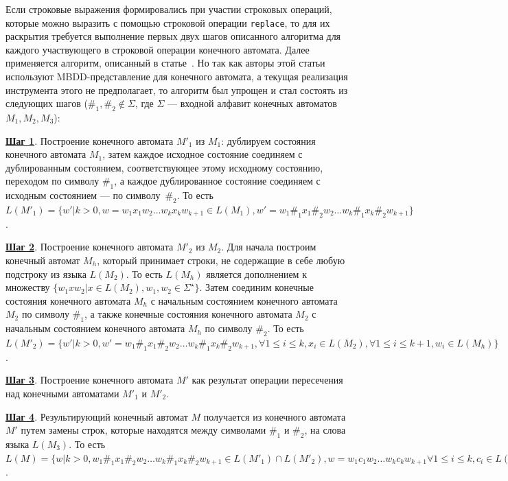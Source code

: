 \documentclass{matmex-diploma}
\begin{document}
Если строковые выражения формировались при участии строковых операций, которые можно выразить с помощью строковой операции \verb|replace|, то для их раскрытия требуется выполнение первых двух шагов описанного алгоритма для каждого участвующего в строковой операции конечного автомата. Далее применяется алгоритм, описанный в статье~\cite{ReplaceFangYu}. Но так как авторы этой статьи используют MBDD-представление для конечного автомата, а текущая реализация инструмента этого не предполагает, то алгоритм был упрощен и стал состоять из следующих шагов ($\#_1, \#_2 \notin \Sigma$, где $\Sigma$ --- входной алфавит конечных автоматов $M_1, M_2, M_3$): 

\textbf{\underline{Шаг 1}}. Построение конечного автомата $M'_1$ из $M_1$: дублируем состояния конечного автомата $M_1$, затем каждое исходное состояние соединяем с дублированным состоянием, соответствующее этому исходному состоянию, переходом по символу $\#_1$, а каждое дублированное состояние соединяем с исходным состоянием --- по символу~$\#_2$. То есть $L(M'_1) = \{ w' | k > 0, w =  w_{1}x_{1}w_{2}\ldots w_{k}x_{k}w_{k+1} \in L(M_1), w' = w_{1}\#_{1}x_{1}\#_{2}w_{2}\ldots w_{k}\#_{1}x_{k}\#_{2}w_{k+1}\}$.

\textbf{\underline{Шаг 2}}. Построение конечного автомата $M'_2$ из $M_2$. Для начала построим конечный автомат $M_h$, который принимает строки, не содержащие в себе любую подстроку из языка $L(M_2)$.  То есть $L(M_h)$ является дополнением к множеству $\{w_{1}xw_{2} | x \in L(M_2), w_1, w_2 \in \Sigma^{\star}\}$. Затем соединим конечные состояния конечного автомата $M_h$ с начальным состоянием конечного автомата $M_2$ по символу $\#_1$, а также конечные состояния конечного автомата $M_2$ с начальным состоянием конечного автомата $M_h$ по символу $\#_2$. То есть $L(M'_2) = \{ w' | k > 0, w' = w_{1}\#_{1}x_{1}\#_{2}w_{2} \ldots w_{k}\#_{1}x_{k}\#_{2}w_{k+1}, \forall 1 \le i \le k, x_i \in L(M_2), \forall 1 \le i \le k+1, w_i \in L(M_h)\}$.

\textbf{\underline{Шаг 3}}. Построение конечного автомата $M'$ как результат операции пересечения над конечными автоматами $M'_1$ и $M'_2$.

\textbf{\underline{Шаг 4}}. Результирующий конечный автомат $M$ получается из конечного автомата $M'$ путем замены строк, которые находятся между символами $\#_1$ и $\#_2$, на слова языка $L(M_3)$. То есть $L(M) = \{ w | k > 0, w_{1}\#_{1}x_{1}\#_{2}w_{2}\ldots w_{k}\#_{1}x_{k}\#_{2}w_{k+1} \in L(M'_1) \cap L(M'_2), w = w_{1}c_{1}w_{2}\ldots w_{k}c_{k}w_{k+1} \forall 1 \le i \le k, c_i \in L(M_3)\}$.
\end{document}
